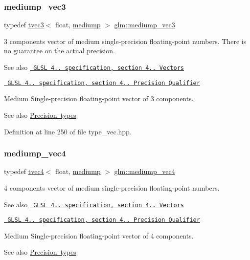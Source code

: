 \subsubsection{\texorpdfstring{mediump\_vec3}{mediump\_vec3}}
{\footnotesize\ttfamily typedef \mbox{\hyperlink{structglm_1_1tvec3}{tvec3}}$<$ float, \mbox{\hyperlink{namespaceglm_a0f04f086094c747d227af4425893f545a6416f3ea0c9025fb21ed50c4d6620482}{mediump}} $>$ \mbox{\hyperlink{group__core__precision_gac76bf24aca62ca13269d262121d04ceb}{glm\+::mediump\+\_\+vec3}}}

3 components vector of medium single-\/precision floating-\/point numbers. There is no guarantee on the actual precision.

\begin{DoxySeeAlso}{See also}
\href{http://www.opengl.org/registry/doc/GLSLangSpec.4.20.8.pdf}{\texttt{ G\+L\+SL 4.. specification, section 4.. Vectors}} 

\href{http://www.opengl.org/registry/doc/GLSLangSpec.4.20.8.pdf}{\texttt{ G\+L\+SL 4.. specification, section 4.. Precision Qualifier}}
\end{DoxySeeAlso}
Medium Single-\/precision floating-\/point vector of 3 components. \begin{DoxySeeAlso}{See also}
\mbox{\hyperlink{group__core__precision}{Precision types}} 
\end{DoxySeeAlso}


Definition at line 250 of file type\+\_\+vec.\+hpp.

\mbox{\label{group__core__precision_ga3e0bdf70b43f0c2863ad9f0fe7da9476}} 
\subsubsection{\texorpdfstring{mediump\_vec4}{mediump\_vec4}}
{\footnotesize\ttfamily typedef \mbox{\hyperlink{structglm_1_1tvec4}{tvec4}}$<$ float, \mbox{\hyperlink{namespaceglm_a0f04f086094c747d227af4425893f545a6416f3ea0c9025fb21ed50c4d6620482}{mediump}} $>$ \mbox{\hyperlink{group__core__precision_ga3e0bdf70b43f0c2863ad9f0fe7da9476}{glm\+::mediump\+\_\+vec4}}}

4 components vector of medium single-\/precision floating-\/point numbers.

\begin{DoxySeeAlso}{See also}
\href{http://www.opengl.org/registry/doc/GLSLangSpec.4.20.8.pdf}{\texttt{ G\+L\+SL 4.. specification, section 4.. Vectors}} 

\href{http://www.opengl.org/registry/doc/GLSLangSpec.4.20.8.pdf}{\texttt{ G\+L\+SL 4.. specification, section 4.. Precision Qualifier}}
\end{DoxySeeAlso}
Medium Single-\/precision floating-\/point vector of 4 components. \begin{DoxySeeAlso}{See also}
\mbox{\hyperlink{group__core__precision}{Precision types}} 
\end{DoxySeeAlso}


